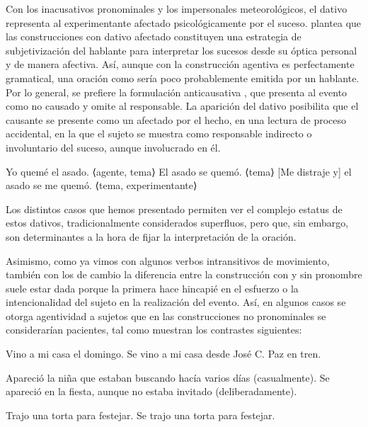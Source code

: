 \begin{recuadro}
Con los inacusativos pronominales y los impersonales meteorológicos, el dativo
representa al experimentante afectado psicológicamente por el suceso.
\textcite{company2017} plantea que las construcciones con dativo afectado
constituyen una estrategia de subjetivización del hablante para interpretar los
sucesos desde su óptica personal y de manera afectiva. Así, aunque con
 la construcción agentiva es perfectamente gramatical, una
oración como  sería poco probablemente emitida por un
hablante. Por lo general, se prefiere la formulación anticausativa
, que presenta al evento como no causado y omite al
responsable. La aparición del dativo  posibilita que el
causante se presente como un afectado por el hecho, en una lectura de proceso
accidental, en la que el sujeto se muestra como responsable indirecto o
involuntario del suceso, aunque involucrado en él.

\begin{exe}
  \ex
    \begin{xlist}
      \ex\label{ex:10-asado-a} Yo quemé el asado. ⟨agente, tema⟩
      \ex\label{ex:10-asado-b} El asado se quemó. ⟨tema⟩
      \ex\label{ex:10-asado-c} [Me distraje y] el asado se me quemó. ⟨tema,
          experimentante⟩
    \end{xlist}
\end{exe}

Los distintos casos que hemos presentado permiten ver el complejo estatus de
estos dativos, tradicionalmente considerados superfluos, pero que, sin embargo,
son determinantes a la hora de fijar la interpretación de la oración.
\end{recuadro}

Asimismo, como ya vimos con algunos verbos intransitivos de movimiento, también
con los de cambio la diferencia entre la construcción con y sin pronombre suele
estar dada porque la primera hace hincapié en el esfuerzo o la intencionalidad
del sujeto en la realización del evento. Así, en algunos casos se otorga
agentividad a sujetos que en las construcciones no pronominales se considerarían
pacientes, tal como muestran los contrastes siguientes:

\begin{exe}
  \ex
    \begin{xlist}
      \ex Vino a mi casa el domingo.
      \ex Se vino a mi casa desde José C. Paz en tren.
    \end{xlist}
  \ex
    \begin{xlist}
      \ex Apareció la niña que estaban buscando hacía varios días
          (casualmente).
      \ex Se apareció en la fiesta, aunque no estaba invitado (deliberadamente).
    \end{xlist}
  \ex
    \begin{xlist}
      \ex Trajo una torta para festejar.
      \ex Se trajo una torta para festejar.
    \end{xlist}
\end{exe}

